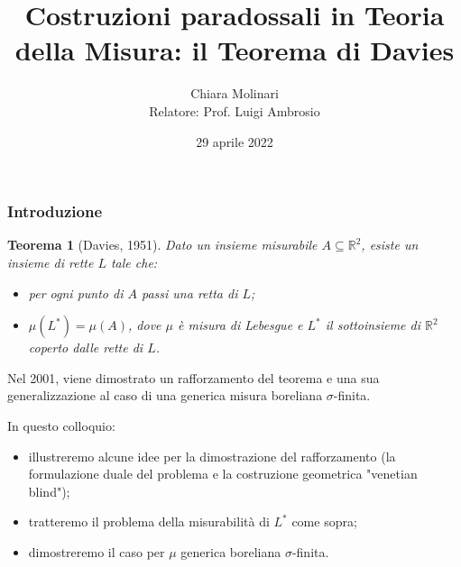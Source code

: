 \documentclass[11pt]{beamer} %
\author[Chiara Molinari]{Chiara Molinari\\[10mm] Relatore: Prof. Luigi Ambrosio}
\title[Il Teorema di Davies]{Costruzioni paradossali in Teoria della Misura: il Teorema di Davies}
\date{29 aprile 2022}
\newcommand{\R}{\mathbb{R}}
\newcommand{\<}{\langle}
\renewcommand{\>}{\rangle}
\theoremstyle{theorem}
\newtheorem{teo}{Teorema}
\theoremstyle{theorem}
\theoremstyle{theorem}
\theoremstyle{theorem}
\theoremstyle{theorem}
\begin{document}

\begin{frame}
	\maketitle
\end{frame}


\begin{frame}[fragile]
	\frametitle{Introduzione}
	\begin{teo}[Davies, 1951] Dato un insieme misurabile $A \subseteq \R^2$, esiste un insieme di rette $L$ tale che:\\
	\begin{itemize}	
	\item per ogni punto di $A$ passi una retta di $L$;\\
	\item $\mu(L^*)=\mu(A)$, dove $\mu$ è misura di Lebesgue e $L^*$ il sottoinsieme di $\R^2$ coperto dalle rette di $L$.
	\end{itemize}
	\end{teo}
	\pause
	
	Nel 2001, viene dimostrato un rafforzamento del teorema e una sua generalizzazione al caso di una generica misura boreliana $\sigma$-finita. 
	\pause
	\medskip
	 
	In questo colloquio:\\
	\begin{itemize}
		\item illustreremo alcune idee per la dimostrazione del rafforzamento (la formulazione duale del problema e la costruzione geometrica "venetian blind");\\ \pause
		\item tratteremo il problema della misurabilità di $L^*$ come sopra;\\ \pause
		\item dimostreremo il caso per $\mu$ generica boreliana $\sigma$-finita.
	\end{itemize}

\end{frame}
	
	
	
	
\end{document}
